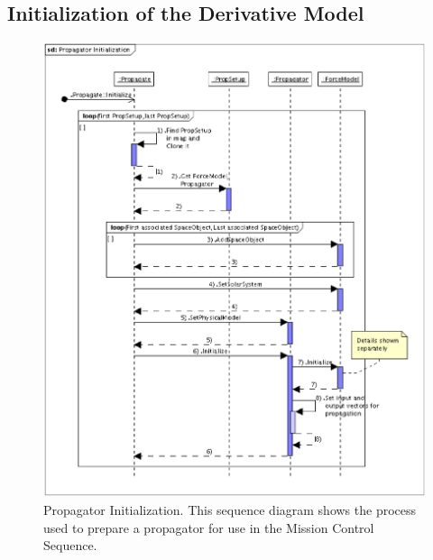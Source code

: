 \subsection{Initialization of the Derivative Model}


\begin{figure}[htb]
\begin{center}
\includegraphics[scale=0.5]{Images/PropagatorInitialization.eps}
\caption[Propagator Initialization]{\label{figure:PropagatorInitialization}Propagator
Initialization.  This sequence diagram shows the process used to prepare a propagator for use in
the Mission Control Sequence.}
\end{center}
\end{figure}



